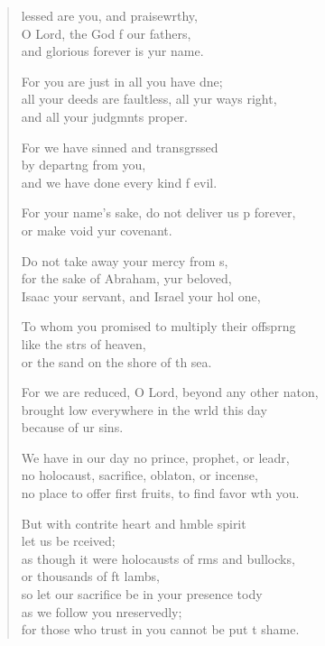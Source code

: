 \begin{verse}
  \begin{patverse}
lessed are you, and praisewrthy,\Flex\\
O Lord, the God f our fathers,\Med\\
and glorious forever is yur name.

For you are just in all you have dne;\Flex\\
all your deeds are faultless, all yur ways right,\Med\\
and all your judgmnts proper.

For we have sinned and transgrssed\Flex\\
by depart\pointup{\i}ng from you,\Med\\
and we have done every kind f evil.

For your name’s sake, do not deliver us p forever,\Med\\
or make void yur covenant.

Do not take away your mercy from s,\Flex\\
for the sake of Abraham, yur beloved,\Med\\
Isaac your servant, and Israel your hol one,

To whom you promised to multiply their offspr\pointup{\i}ng\Flex\\
like the strs of heaven,\Med\\
or the sand on the shore of th sea.

For we are reduced, O Lord, beyond any other nat\pointup{\i}on,\Flex\\
brought low everywhere in the wrld this day\Med\\
because of ur sins.

We have in our day no prince, prophet, or leadr,\Flex\\
no holocaust, sacrifice, oblat\pointup{\i}on, or incense,\Med\\
no place to offer first fruits, to find favor w\pointup{\i}th you.

But with contrite heart and hmble spirit\Med\\
let us be rceived;\\
as though it were holocausts of rms and bullocks,\Med\\
or thousands of ft lambs,\\
so let our sacrifice be in your presence tody\Flex\\
as we follow you nreservedly;\Med\\
for those who trust in you cannot be put t shame.


\end{patverse}
\end{verse}
